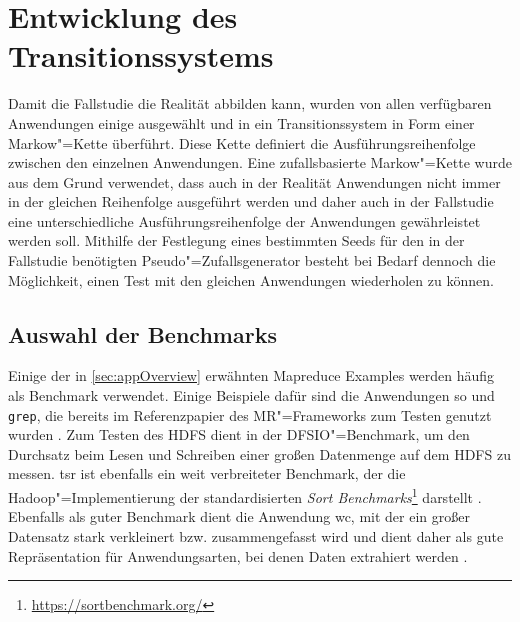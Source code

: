 \section{Entwicklung des Transitionssystems}
\label{sec:transitionsystem}

Damit die Fallstudie die Realität abbilden kann, wurden von allen verfügbaren Anwendungen einige ausgewählt und in ein Transitionssystem in Form einer Markow"=Kette überführt.
Diese Kette definiert die Ausführungsreihenfolge zwischen den einzelnen Anwendungen.
Eine zufallsbasierte Markow"=Kette wurde aus dem Grund verwendet, dass auch in der Realität Anwendungen nicht immer in der gleichen Reihenfolge ausgeführt werden und daher auch in der Fallstudie eine unterschiedliche Ausführungsreihenfolge der Anwendungen gewährleistet werden soll.
Mithilfe der Festlegung eines bestimmten Seeds für den in der Fallstudie benötigten Pseudo"=Zufallsgenerator besteht bei Bedarf dennoch die Möglichkeit, einen Test mit den gleichen Anwendungen wiederholen zu können.

\subsection{Auswahl der Benchmarks}
\label{subsec:appSelection}

Einige der in \cref{sec:appOverview} erwähnten Mapreduce Examples werden häufig als Benchmark verwendet.
Einige Beispiele dafür sind die Anwendungen \acl{so} und \texttt{grep}, die bereits im Referenzpapier des \ac{MR}"=Frameworks zum Testen genutzt wurden \cite{Dean2004}.
Zum Testen des \ac{HDFS} dient in \cite{Shvachko2010} der DFSIO"=Benchmark, um den Durchsatz beim Lesen und Schreiben einer großen Datenmenge auf dem \ac{HDFS} zu messen.
\acl{tsr} ist ebenfalls ein weit verbreiteter Benchmark, der die Hadoop"=Implementierung der standardisierten \emph{Sort Benchmarks}\footnote{\url{https://sortbenchmark.org/}} darstellt \cite{Graves2013}.
Ebenfalls als guter Benchmark dient die Anwendung \acl{wc}, mit der ein großer Datensatz stark verkleinert bzw. zusammengefasst wird und dient daher als gute Repräsentation für Anwendungsarten, bei denen Daten extrahiert werden \cite{Huang2010,Chen2012}.

